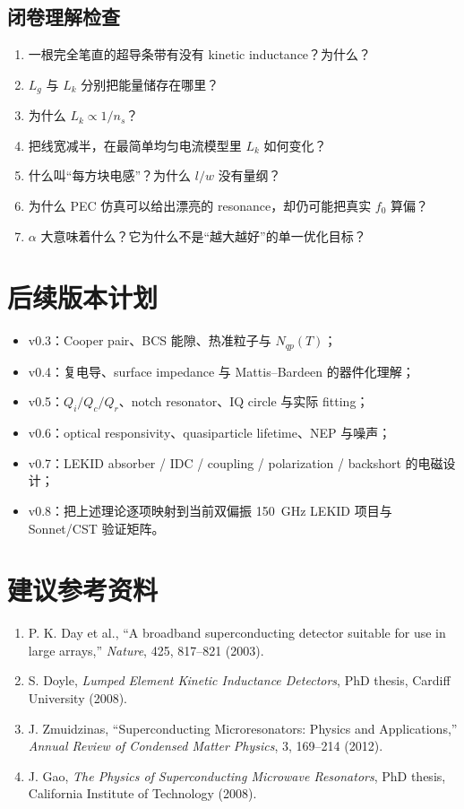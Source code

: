 \documentclass[11pt,a4paper,openany]{ctexrep}
\begin{document}
\section{闭卷理解检查}
\begin{checkpointbox}
\begin{enumerate}
  \item 一根完全笔直的超导条带有没有 kinetic inductance？为什么？
  \item $L_g$ 与 $L_k$ 分别把能量储存在哪里？
  \item 为什么 $L_k\propto1/n_s$？
  \item 把线宽减半，在最简单均匀电流模型里 $L_k$ 如何变化？
  \item 什么叫“每方块电感”？为什么 $l/w$ 没有量纲？
  \item 为什么 PEC 仿真可以给出漂亮的 resonance，却仍可能把真实 $f_0$ 算偏？
  \item $\alpha$ 大意味着什么？它为什么不是“越大越好”的单一优化目标？
\end{enumerate}
\end{checkpointbox}

\chapter*{后续版本计划}
\begin{itemize}
  \item v0.3：Cooper pair、BCS 能隙、热准粒子与 $N_{qp}(T)$；
  \item v0.4：复电导、surface impedance 与 Mattis--Bardeen 的器件化理解；
  \item v0.5：$Q_i/Q_c/Q_r$、notch resonator、IQ circle 与实际 fitting；
  \item v0.6：optical responsivity、quasiparticle lifetime、NEP 与噪声；
  \item v0.7：LEKID absorber / IDC / coupling / polarization / backshort 的电磁设计；
  \item v0.8：把上述理论逐项映射到当前双偏振 \SI{150}{GHz} LEKID 项目与 Sonnet/CST 验证矩阵。
\end{itemize}

\chapter*{建议参考资料}
\begin{enumerate}
  \item P. K. Day et al., ``A broadband superconducting detector suitable for use in large arrays,'' \textit{Nature}, 425, 817--821 (2003).
  \item S. Doyle, \textit{Lumped Element Kinetic Inductance Detectors}, PhD thesis, Cardiff University (2008).
  \item J. Zmuidzinas, ``Superconducting Microresonators: Physics and Applications,'' \textit{Annual Review of Condensed Matter Physics}, 3, 169--214 (2012).
  \item J. Gao, \textit{The Physics of Superconducting Microwave Resonators}, PhD thesis, California Institute of Technology (2008).
\end{enumerate}
\end{document}

